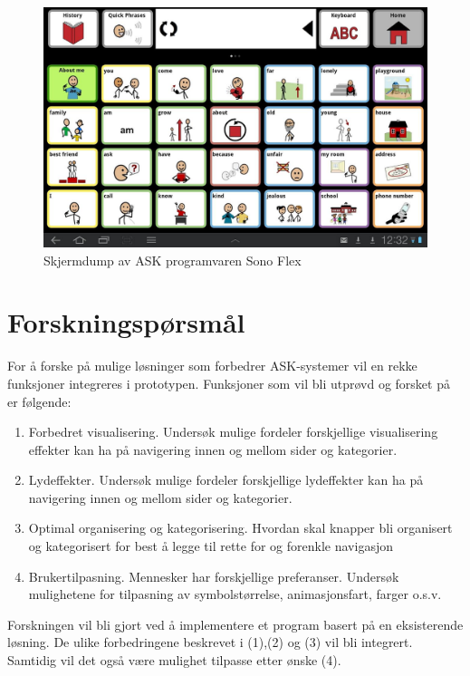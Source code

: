\documentclass[phd,tocprelim]{cornell}
\begin{document}
\begin{figure}[ht!]
\centering
\includegraphics[width=150mm]{SonoFlex2}
\caption{Skjermdump av ASK programvaren Sono Flex}
\label{fig:SonoFlex}
\end{figure}


\section{Forskningspørsmål}
\label{sec:ResearchQuestion}

For å forske på mulige løsninger som forbedrer ASK-systemer vil en rekke funksjoner integreres i prototypen. Funksjoner som vil bli utprøvd og forsket på er følgende:


\begin{enumerate} 
\label{lst:features}
\item Forbedret visualisering. Undersøk mulige fordeler forskjellige visualisering effekter kan ha på navigering innen og mellom sider og kategorier.
\item Lydeffekter. Undersøk mulige fordeler forskjellige lydeffekter kan ha på navigering innen og mellom sider og kategorier.
\item Optimal organisering og kategorisering. Hvordan skal knapper bli organisert og kategorisert for best å legge til rette for og forenkle navigasjon
\item Brukertilpasning. Mennesker har forskjellige preferanser. Undersøk mulighetene for tilpasning av symbolstørrelse, animasjonsfart, farger o.s.v. 
\end{enumerate} 


Forskningen vil bli gjort ved å implementere et program basert på en eksisterende løsning. De ulike forbedringene beskrevet i (1),(2) og (3) vil bli integrert. Samtidig vil det også være mulighet tilpasse etter ønske (4). 
\end{document}
